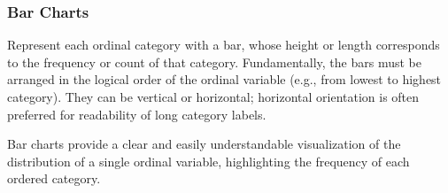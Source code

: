 \documentclass[
  letterpaper,
  DIV=11,
  numbers=noendperiod]{scrartcl}
\begin{document}
\hypertarget{bar-charts}{%
\subsubsection*{Bar Charts}\label{bar-charts}}

Represent each ordinal category with a bar, whose height or length
corresponds to the frequency or count of that category. Fundamentally,
the bars must be arranged in the logical order of the ordinal variable
(e.g., from lowest to highest category). They can be vertical or
horizontal; horizontal orientation is often preferred for readability of
long category labels.

Bar charts provide a clear and easily understandable visualization of
the distribution of a single ordinal variable, highlighting the
frequency of each ordered category.
\end{document}
